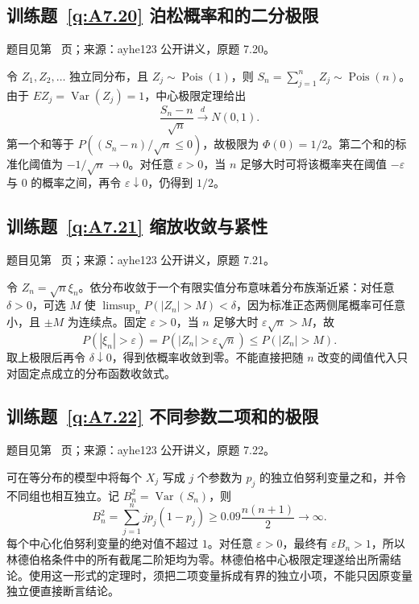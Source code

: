 \documentclass[UTF8,12pt,a4paper,fontset=fandol]{ctexbook}
\begin{document}
\subsection*{训练题~\ref{q:A7.20} 泊松概率和的二分极限}\label{a:A7.20}{\small 题目见第~\pageref{q:A7.20} 页；来源：ayhe123 公开讲义，原题 7.20。}
\begin{solve}令 $Z_1,Z_2,\ldots$ 独立同分布，且 $Z_j\sim\operatorname{Pois}(1)$，则 $S_n=\sum_{j=1}^nZ_j\sim\operatorname{Pois}(n)$。由于 $EZ_j=\operatorname{Var}(Z_j)=1$，中心极限定理给出\[\frac{S_n-n}{\sqrt n}\xrightarrow{d}N(0,1).\]第一个和等于 $P((S_n-n)/\sqrt n\le0)$，故极限为 $\Phi(0)=1/2$。第二个和的标准化阈值为 $-1/\sqrt n\to0$。对任意 $\varepsilon>0$，当 $n$ 足够大时可将该概率夹在阈值 $-\varepsilon$ 与 $0$ 的概率之间，再令 $\varepsilon\downarrow0$，仍得到 $1/2$。\end{solve}

\subsection*{训练题~\ref{q:A7.21} 缩放收敛与紧性}\label{a:A7.21}{\small 题目见第~\pageref{q:A7.21} 页；来源：ayhe123 公开讲义，原题 7.21。}
\begin{solve}令 $Z_n=\sqrt n\xi_n$。依分布收敛于一个有限实值分布意味着分布族渐近紧：对任意 $\delta>0$，可选 $M$ 使 $\limsup_nP(|Z_n|>M)<\delta$，因为标准正态两侧尾概率可任意小，且 $\pm M$ 为连续点。固定 $\varepsilon>0$，当 $n$ 足够大时 $\varepsilon\sqrt n>M$，故\[P(|\xi_n|>\varepsilon)=P(|Z_n|>\varepsilon\sqrt n)\le P(|Z_n|>M).\]取上极限后再令 $\delta\downarrow0$，得到依概率收敛到零。不能直接把随 $n$ 改变的阈值代入只对固定点成立的分布函数收敛式。\end{solve}

\subsection*{训练题~\ref{q:A7.22} 不同参数二项和的极限}\label{a:A7.22}{\small 题目见第~\pageref{q:A7.22} 页；来源：ayhe123 公开讲义，原题 7.22。}
\begin{solve}可在等分布的模型中将每个 $X_j$ 写成 $j$ 个参数为 $p_j$ 的独立伯努利变量之和，并令不同组也相互独立。记 $B_n^2=\operatorname{Var}(S_n)$，则\[B_n^2=\sum_{j=1}^n jp_j(1-p_j)\ge0.09\frac{n(n+1)}2\longrightarrow\infty.\]每个中心化伯努利变量的绝对值不超过 $1$。对任意 $\varepsilon>0$，最终有 $\varepsilon B_n>1$，所以林德伯格条件中的所有截尾二阶矩均为零。林德伯格中心极限定理遂给出所需结论。使用这一形式的定理时，须把二项变量拆成有界的独立小项，不能只因原变量独立便直接断言结论。\end{solve}
\end{document}
